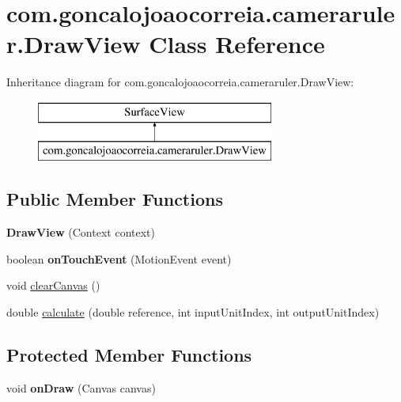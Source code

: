 \hypertarget{classcom_1_1goncalojoaocorreia_1_1cameraruler_1_1_draw_view}{}\section{com.\+goncalojoaocorreia.\+cameraruler.\+Draw\+View Class Reference}
\label{classcom_1_1goncalojoaocorreia_1_1cameraruler_1_1_draw_view}
Inheritance diagram for com.\+goncalojoaocorreia.\+cameraruler.\+Draw\+View\+:\begin{figure}[H]
\begin{center}
\leavevmode
\includegraphics[height=2.000000cm]{classcom_1_1goncalojoaocorreia_1_1cameraruler_1_1_draw_view}
\end{center}
\end{figure}
\subsection*{Public Member Functions}
\begin{DoxyCompactItemize}
\item 
\mbox{\label{classcom_1_1goncalojoaocorreia_1_1cameraruler_1_1_draw_view_a30de889a42e330092353bce0c43971d6}} 
{\bfseries Draw\+View} (Context context)
\item 
\mbox{\label{classcom_1_1goncalojoaocorreia_1_1cameraruler_1_1_draw_view_ab949f172743a634838e9a654ffc9a38e}} 
boolean {\bfseries on\+Touch\+Event} (Motion\+Event event)
\item 
void \hyperlink{classcom_1_1goncalojoaocorreia_1_1cameraruler_1_1_draw_view_ad3442caa5ed3ea50ed0735087f7813c3}{clear\+Canvas} ()
\item 
double \hyperlink{classcom_1_1goncalojoaocorreia_1_1cameraruler_1_1_draw_view_a454612ac5caa9f18d54f28222e807468}{calculate} (double reference, int input\+Unit\+Index, int output\+Unit\+Index)
\end{DoxyCompactItemize}
\subsection*{Protected Member Functions}
\begin{DoxyCompactItemize}
\item 
\mbox{\label{classcom_1_1goncalojoaocorreia_1_1cameraruler_1_1_draw_view_acbd0361ebb728014cf9afd0f177db787}} 
void {\bfseries on\+Draw} (Canvas canvas)
\end{DoxyCompactItemize}
